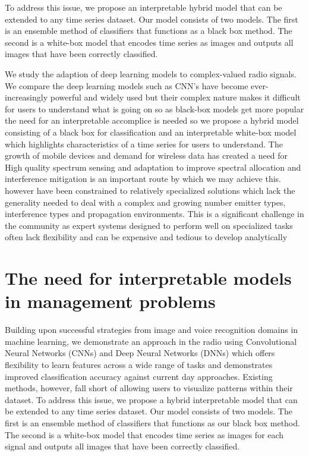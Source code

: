 \documentclass{turabian-thesis}
\begin{document}
To address this issue, we propose an interpretable hybrid  model that can be extended to any time series dataset. Our model consists of two models. The first is an ensemble method of classifiers that functions as a black box method. The second is a white-box model that encodes time series as images and outputs all images that have been correctly classified.

We study the adaption of deep learning models to complex-valued radio signals. We compare the deep learning models such as CNN’s have become ever-increasingly powerful and widely used but their complex nature makes it difficult for users to understand what is going on so as black-box models get more popular the need for an interpretable accomplice is needed so we propose a hybrid model consisting of a black box for classification and an interpretable white-box model which highlights characteristics of a time series for users to understand. 
The growth of mobile devices and demand for wireless data has created a need for  High quality spectrum sensing and adaptation to improve spectral allocation and interference mitigation is an important route by which we may achieve this.  however have been constrained to relatively specialized solutions which lack the generality needed to deal with a complex and growing number emitter types, interference types and propagation environments.
This is a significant challenge in the community as expert systems designed to perform well on specialized tasks often lack flexibility and can be expensive and tedious to develop analytically


\section{The need for interpretable models in management problems}





Building upon successful strategies from image and voice recognition domains in machine learning, we demonstrate an approach in the radio using Convolutional Neural Networks (CNNs) and Deep Neural Networks (DNNs) which offers flexibility to learn features across a wide range of tasks and demonstrates improved classification accuracy against current day approaches.  Existing methods, however, fall short of allowing users to visualize patterns within their dataset. To address this issue, we propose a hybrid interpretable model that can be extended to any time series dataset. Our model consists of two models. The first is an ensemble method of classifiers that functions as our black box method. The second is a white-box model that encodes time series as images for each signal and outputs all images that have been correctly classified.
\end{document}
